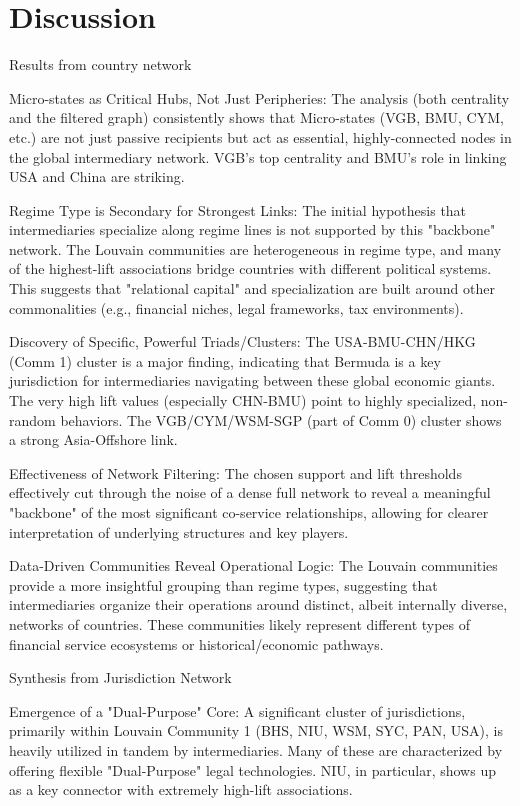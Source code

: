 \chapter{Discussion}
\label{chap:discussion}

Results from country network

Micro-states as Critical Hubs, Not Just Peripheries: The analysis (both centrality and the filtered graph) consistently shows that Micro-states (VGB, BMU, CYM, etc.) are not just passive recipients but act as essential, highly-connected nodes in the global intermediary network. VGB's top centrality and BMU's role in linking USA and China are striking.

Regime Type is Secondary for Strongest Links: The initial hypothesis that intermediaries specialize along regime lines is not supported by this "backbone" network. The Louvain communities are heterogeneous in regime type, and many of the highest-lift associations bridge countries with different political systems. This suggests that "relational capital" and specialization are built around other commonalities (e.g., financial niches, legal frameworks, tax environments).

Discovery of Specific, Powerful Triads/Clusters:
The USA-BMU-CHN/HKG (Comm 1) cluster is a major finding, indicating that Bermuda is a key jurisdiction for intermediaries navigating between these global economic giants. The very high lift values (especially CHN-BMU) point to highly specialized, non-random behaviors.
The VGB/CYM/WSM-SGP (part of Comm 0) cluster shows a strong Asia-Offshore link.

Effectiveness of Network Filtering: The chosen support and lift thresholds effectively cut through the noise of a dense full network to reveal a meaningful "backbone" of the most significant co-service relationships, allowing for clearer interpretation of underlying structures and key players.

Data-Driven Communities Reveal Operational Logic: The Louvain communities provide a more insightful grouping than regime types, suggesting that intermediaries organize their operations around distinct, albeit internally diverse, networks of countries. These communities likely represent different types of financial service ecosystems or historical/economic pathways.



Synthesis from Jurisdiction Network

Emergence of a "Dual-Purpose" Core: A significant cluster of jurisdictions, primarily within Louvain Community 1 (BHS, NIU, WSM, SYC, PAN, USA), is heavily utilized in tandem by intermediaries. Many of these are characterized by offering flexible "Dual-Purpose" legal technologies. NIU, in particular, shows up as a key connector with extremely high-lift associations.

